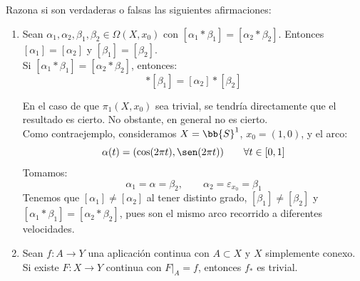 \begin{ejercicio}\label{ej:4.1.22}%
    Razona si son verdaderas o falsas las siguientes afirmaciones:
    \begin{enumerate}[label=\alph*)]
        \item Sean $\alpha_1,\alpha_2,\beta_1,\beta_2\in \Omega(X,x_0)$  con $[\alpha_1\ast \beta_1] = [\alpha_2\ast \beta_2]$. Entonces $[\alpha_1] = [\alpha_2]$ y $[\beta_1] = [\beta_2]$.\\
        
            Si $[\alpha_1\ast \beta_1] = [\alpha_2\ast \beta_2]$, entonces:
            \begin{equation*}
                [\alpha_1]\ast [\beta_1] = [\alpha_2]\ast [\beta_2]
            \end{equation*}

            En el caso de que $\pi_1(X,x_0)$ sea trivial, se tendría directamente que el resultado es cierto. No obstante, en general no es cierto.\\

            Como contraejemplo, consideramos $X=\bb{S}^1$, $x_0 =(1,0)$, y el arco:
            \begin{equation*}
                \alpha(t) = (\cos(2\pi t), \sen(2\pi t)) \qquad \forall t\in [0,1]
            \end{equation*}
            Tomamos:
            \begin{equation*}
                \alpha_1 = \alpha = \beta_2, \qquad \alpha_2 = \varepsilon_{x_0} = \beta_1
            \end{equation*}
            Tenemos que $[\alpha_1] \neq [\alpha_2]$ al tener distinto grado, $[\beta_1]\neq[\beta_2]$ y $[\alpha_1\ast \beta_1] = [\alpha_2\ast \beta_2]$, pues son el mismo arco recorrido a diferentes velocidades.
        \item Sean $f:A\to Y$ una aplicación continua con $A\subset X$ y $X$ simplemente conexo. Si existe $F:X\to Y$ continua con $F\big|_A = f$, entonces $f_\ast$ es trivial.\\


\end{enumerate}
\end{ejercicio}
